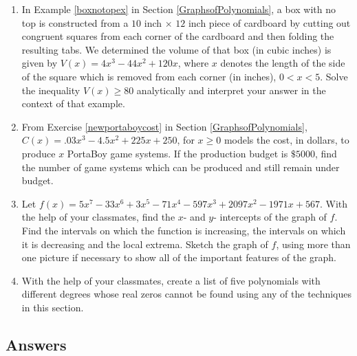 \begin{enumerate}
\setcounter{enumi}{\value{HW}}

\item  In Example \ref{boxnotopex} in Section \ref{GraphsofPolynomials}, a box with no top is constructed from a $10$ inch $\times$ $12$ inch piece of cardboard by cutting out congruent squares from each corner of the cardboard and then folding the resulting tabs.  We determined the volume of that box (in cubic inches) is given by  $V(x) = 4x^3-44x^2+120x$, where $x$ denotes the length of the side of the square which is removed from each corner (in inches), $0 < x < 5$.  Solve the inequality $V(x) \geq 80$ analytically and interpret your answer in the context of that example.

\item  From Exercise \ref{newportaboycost} in Section \ref{GraphsofPolynomials}, $C(x) = .03x^{3} - 4.5x^{2} + 225x + 250$, for $x \geq 0$ models the cost, in dollars, to produce $x$ PortaBoy game systems. If the production budget is $\$5000$, find the number of game systems which can be produced and still remain under budget.

\item Let $f(x) = 5x^{7} - 33x^{6} + 3x^{5} - 71x^{4} - 597x^{3} + 2097x^{2} - 1971x + 567$.  With the help of your classmates, find the $x$- and $y$- intercepts of the graph of $f$.  Find the intervals on which the function is increasing, the intervals on which it is decreasing and the local extrema.  Sketch the graph of $f$, using more than one picture if necessary to show all of the important features of the graph.  

\item With the help of your classmates, create a list of five polynomials with different degrees whose real zeros cannot be found using any of the techniques in this section.

\setcounter{HW}{\value{enumi}}
\end{enumerate}
 



\newpage

\subsection{Answers}

